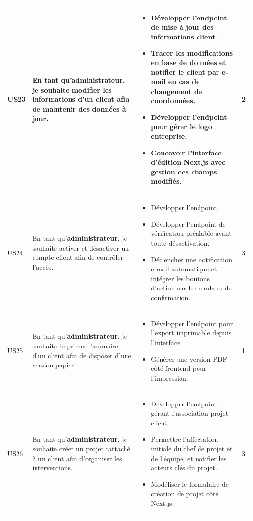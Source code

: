 \begin{longtable}{|C{1cm}|L{5.6cm}|L{8cm}|C{0.85cm}|}
US23 & En tant qu'\textbf{administrateur}, je souhaite modifier les informations d'un client afin de maintenir des données à jour. &
\begin{itemize}[nosep, left=0pt, label={$\bullet$}]
\item Développer l'endpoint de mise à jour des informations client.
\item Tracer les modifications en base de données et notifier le client par e-mail en cas de changement de coordonnées.
\item Développer l'endpoint pour gérer le logo entreprise.
\item Concevoir l'interface d'édition Next.js avec gestion des champs modifiés.
\end{itemize} & 2 \\
\hline

US24 & En tant qu'\textbf{administrateur}, je souhaite activer et désactiver un compte client afin de contrôler l'accès. &
\begin{itemize}[nosep, left=0pt, label={$\bullet$}]
\item Développer l'endpoint.
\item Développer l'endpoint de vérification préalable avant toute désactivation.
\item Déclencher une notification e-mail automatique et intégrer les boutons d'action sur les modales de confirmation.
\end{itemize} & 3 \\
\hline

US25 & En tant qu'\textbf{administrateur}, je souhaite imprimer l'annuaire d'un client afin de disposer d'une version papier. &
\begin{itemize}[nosep, left=0pt, label={$\bullet$}]
\item Développer l'endpoint pour l'export imprimable depuis l'interface.
\item Générer une version PDF côté frontend pour l'impression.
\end{itemize} & 1 \\
\hline

US26 & En tant qu'\textbf{administrateur}, je souhaite créer un projet rattaché à un client afin d'organiser les interventions. &
\begin{itemize}[nosep, left=0pt, label={$\bullet$}]
\item Développer l'endpoint gérant l'association projet-client.
\item Permettre l'affectation initiale du chef de projet et de l'équipe, et notifier les acteurs clés du projet.
\item Modéliser le formulaire de création de projet côté Next.js.
\end{itemize} & 3 \\
\hline


\end{longtable}
